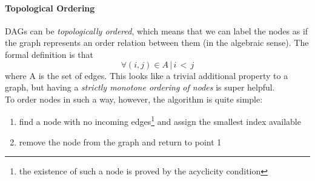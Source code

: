 \documentclass{article}
\begin{document}
				\paragraph{Topological Ordering}
					DAGs can be \textit{topologically ordered}, which means that we can label the nodes as if the graph represents an order relation between them (in the algebraic sense). The formal definition is that
					\begin{equation}
						\forall (i, j) \in A\, |\, i\, <\, j
					\end{equation}
					where A is the set of edges. This looks like a trivial additional property to a graph, but having a \textit{strictly monotone ordering of nodes} is super helpful.\\
					To order nodes in such a way, however, the algorithm is quite simple:
					\begin{enumerate}
						\item find a node with no incoming edges\footnote{the existence of such a node is proved by the acyclicity condition} and assign the smallest index available
						\item remove the node from the graph and return to point 1
					\end{enumerate}
				
\end{document}

